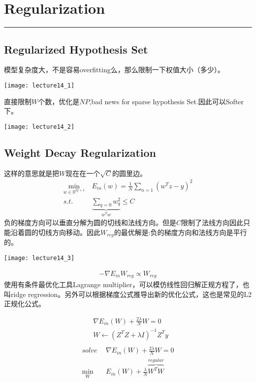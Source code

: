 \section{Regularization}
\noindent
{\color{LightRubineRed} \rule{\linewidth}{1mm} }
\subsection{Regularized Hypothesis Set} %
\label{sub:regularized_hypothesis_set}
模型复杂度大，不是容易overfitting么，那么限制一下权值大小（多少）。 \par
\begin{center}
\texttt{[image: lecture14\_1]}\\
\end{center}
直接限制$W$个数，优化是$NP$,bad news for \textcolor{mypink3}{sparse hypothesis Set}.因此可以Softer下。
\begin{center}
\texttt{[image: lecture14\_2]}\\
\end{center}

\subsection{Weight Decay Regularization} %
这样的意思就是把$W$现在在一个$\sqrt{C}$的圆里边。
\begin{align*}
\underset{w \in \mathbb{R}^{Q+1}}{\min} \ &E_{in}(w) = \frac{1}{N}\sum_{n=1}(w^Tz-y)^2 \\
s.t. \quad &\underbrace{\sum_{q=0}w_q^2}_{w^Tw} \leq C
\end{align*}
负的梯度方向可以垂直分解为圆的切线和法线方向。但是$C$限制了法线方向因此只能沿着圆的切线方向移动。因此$W_{reg}$的最优解是:负的梯度方向和法线方向是平行的。 \par
\begin{center}
\texttt{[image: lecture14\_3]}\\
\end{center}
\begin{align*}
-\nabla{E_{in}{W_{reg}}} \propto W_{reg}
\end{align*}
使用有条件最优化工具Lagrange multiplier，可以模仿线性回归解正规方程了，也叫ridge regression。另外可以根据梯度公式推导出新的优化公式，这也是常见的L2正规化公式。\par
\begin{align*}
&\nabla{E_{in}(W) + \frac{2\lambda}{N}W} = 0 \\
&W \gets (Z^TZ + \lambda I)^{-1}Z^Ty \\
\end{align*}
\begin{align*}
solve \ \ &\nabla{E_{in}(W) + \frac{2\lambda}{N}W} = 0 \\
\underset{W}{\min} \quad &E_{in}(W) + \frac{\lambda}{N}\overbrace{W^TW}^{regular}
\end{align*}


